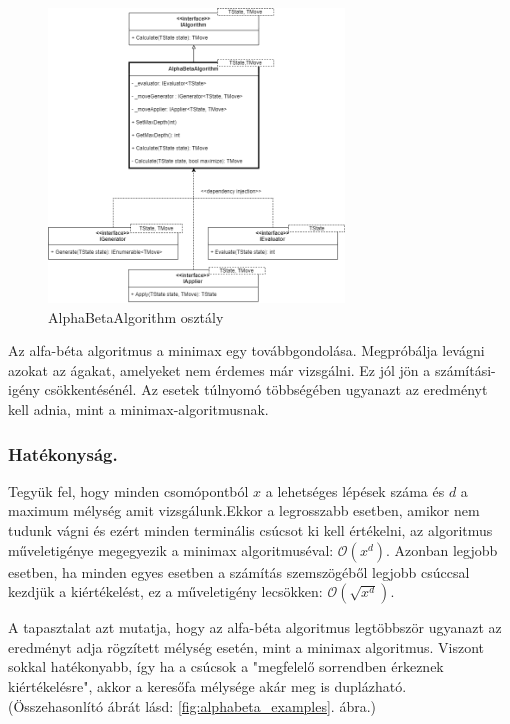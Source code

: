 \documentclass[twoside, a4paper, 12pt]{book}
\begin{document}
\begin{figure}[htbp]
	\centering
	\includegraphics[width=0.7\textwidth]{img/alphabetaAbstractDiagram.png}
	\caption{AlphaBetaAlgorithm osztály}
	\label{fig:alphaBetaAbstractDiagram}
\end{figure}
Az alfa-béta algoritmus a minimax egy továbbgondolása. Megpróbálja levágni azokat az ágakat, amelyeket nem érdemes már vizsgálni. Ez jól jön a számítási-igény csökkentésénél. Az esetek túlnyomó többségében ugyanazt az eredményt kell adnia, mint a minimax-algoritmusnak.

\subsubsection*{Hatékonyság.} Tegyük fel, hogy minden csomópontból $x$ a lehetséges lépések száma és $d$ a maximum mélység amit vizsgálunk.Ekkor a legrosszabb esetben, amikor nem tudunk vágni és ezért minden terminális csúcsot ki kell értékelni, az algoritmus műveletigénye megegyezik a minimax algoritmuséval: $ \mathcal{O}(x^d)$.
Azonban legjobb esetben, ha minden egyes esetben a számítás szemszögéből legjobb csúccsal kezdjük a kiértékelést, ez a műveletigény lecsökken: $\mathcal{O}(\sqrt{x^d})$.\cite{alfaBetaPruneHu}

A tapasztalat azt mutatja, hogy az alfa-béta algoritmus legtöbbször ugyanazt az eredményt adja rögzített mélység esetén, mint a minimax algoritmus. Viszont sokkal hatékonyabb, így ha a csúcsok a "megfelelő sorrendben érkeznek kiértékelésre", akkor a keresőfa mélysége akár meg is duplázható. \\ (Összehasonlító ábrát lásd: \ref{fig:alphabeta_examples}. ábra.)
\end{document}
